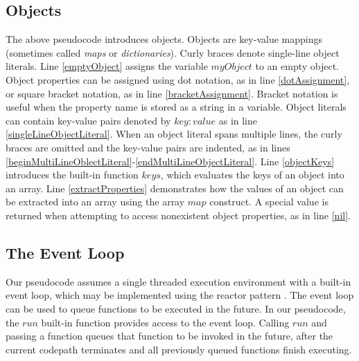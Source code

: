 \subsection{Objects}\label{objects}

The above pseudocode introduces objects. Objects are key-value mappings (sometimes called \emph{maps} or \emph{dictionaries}). Curly braces denote single-line object literals. Line \ref{emptyObject} assigns the variable $myObject$ to an empty object. Object properties can be assigned using dot notation, as in line \ref{dotAssignment}, or square bracket notation, as in line \ref{bracketAssignment}. Bracket notation is useful when the property name is stored as a string in a variable. Object literals can contain key-value pairs denoted by $key: value$ as in line \ref{singleLineObjectLiteral}. When an object literal spans multiple lines, the curly braces are omitted and the key-value pairs are indented, as in lines \ref{beginMultiLineOblectLiteral}-\ref{endMultiLineObjectLiteral}. Line \ref{objectKeys} introduces the built-in function $keys$, which evaluates the keys of an object into an array. Line \ref{extractProperties} demonstrates how the values of an object can be extracted into an array using the array $map$ construct. A special value  is returned when attempting to access nonexistent object properties, as in line \ref{nil}.

\subsection{The Event Loop} \label{run}
Our pseudocode assumes a single threaded execution environment with a built-in event loop, which may be implemented using the reactor pattern \cite{schmidt1995reactor}. The event loop can be used to queue functions to be executed in the future. In our pseudocode, the $run$ built-in function provides access to the event loop. Calling $run$ and passing a function queues that function to be invoked in the future, after the current codepath terminates and all previously queued functions finish executing.

